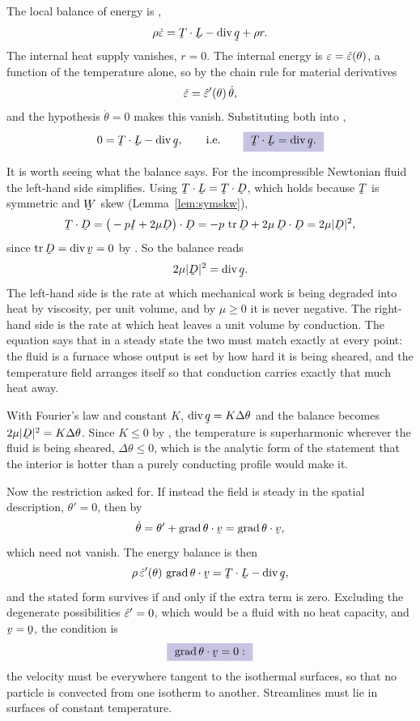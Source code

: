\begin{solution}
The local balance of energy is ,
\[
   \rho\dot\eps=\ip\bT\bL-\dvg\bq+\rho r .
\]
The internal heat supply vanishes, $r=0$. The internal energy is
$\varepsilon=\hat{\varepsilon}(\theta)$, a function of the temperature alone, so by the
chain rule for material derivatives
\[
   \dot{\varepsilon}=\hat{\varepsilon}'(\theta)\,\dot\theta ,
\]
and the hypothesis $\dot\theta=0$ makes this vanish. Substituting both
into ,
\[
   0=\ip\bT\bL-\dvg\bq,
   \qquad\text{i.e.}\qquad
   \boxed{\ \ip\bT\bL=\dvg\bq . \ }
\]

It is worth seeing what the balance says. For the incompressible
Newtonian fluid  the left-hand side simplifies. Using
$\ip\bT\bL=\ip\bT\bD$, which holds because $\bT$ is symmetric and $\bW$
skew (Lemma~\ref{lem:symskw}),
\[
   \ip\bT\bD=\ip{\big(-p\I+2\mu\bD\big)}\bD
   =-p\,\tr\bD+2\mu\,\ip\bD\bD=2\mu|\bD|^{2},
\]
since $\tr\bD=\dvg\bv=0$ by . So the balance reads
\[
   2\mu|\bD|^{2}=\dvg\bq .
\]
The left-hand side is the rate at which mechanical work is being
degraded into heat by viscosity, per unit volume, and by $\mu\geq0$ it
is never negative. The right-hand side is the rate at which heat leaves
a unit volume by conduction. The equation says that in a steady state
the two must match exactly at every point: the fluid is a furnace whose
output is set by how hard it is being sheared, and the temperature field
arranges itself so that conduction carries exactly that much heat away.

With Fourier's law  and constant $K$, $\dvg\bq=K\Delta\theta$
and the balance becomes $2\mu|\bD|^{2}=K\Delta\theta$. Since $K\leq0$ by
, the temperature is superharmonic wherever the fluid is being
sheared, $\Delta\theta\leq0$, which is the analytic form of the
statement that the interior is hotter than a purely conducting profile
would make it.

Now the restriction asked for. If instead the field is steady
in the spatial description, $\theta'=0$, then by 
\[
   \dot\theta=\theta'+\ip{\grad\theta}\bv=\ip{\grad\theta}\bv ,
\]
which need not vanish. The energy balance is then
\[
   \rho\,\hat\eps'(\theta)\,\ip{\grad\theta}\bv=\ip\bT\bL-\dvg\bq ,
\]
and the stated form survives if and only if the extra term is zero.
Excluding the degenerate possibilities $\hat{\varepsilon}'=0$, which would be a
fluid with no heat capacity, and $\bv=\bze$, the condition is
\[
   \boxed{\ \ip{\grad\theta}\bv=0 :\ }
\]
the velocity must be everywhere tangent to the isothermal surfaces, so
that no particle is convected from one isotherm to another. Streamlines
must lie in surfaces of constant temperature.


\end{solution}
